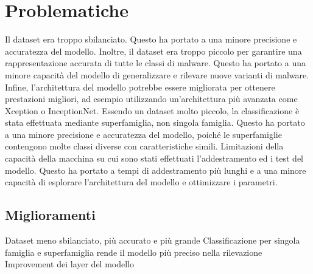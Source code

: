 \section{Problematiche}
\label{Problema}
Il dataset era troppo sbilanciato. Questo ha portato a una minore precisione e accuratezza del modello. Inoltre, il dataset era troppo piccolo per garantire una rappresentazione accurata di tutte le classi di malware. Questo ha portato a una minore capacità del modello di generalizzare e rilevare nuove varianti di malware. Infine, l'architettura del modello potrebbe essere migliorata per ottenere prestazioni migliori, ad esempio utilizzando un'architettura più avanzata come Xception o InceptionNet.
Essendo un dataset molto piccolo, la classificazione è stata effettuata mediante superfamiglia, non singola famiglia. Questo ha portato a una minore precisione e accuratezza del modello, poiché le superfamiglie contengono molte classi diverse con caratteristiche simili.
Limitazioni della capacità della macchina su cui sono stati effettuati l'addestramento ed i test del modello. Questo ha portato a tempi di addestramento più lunghi e a una minore capacità di esplorare l'architettura del modello e ottimizzare i parametri.

\subsection{Miglioramenti}
Dataset meno sbilanciato, più accurato e più grande
Classificazione per singola famiglia e superfamiglia rende il modello più preciso nella rilevazione
Improvement dei layer del modello
